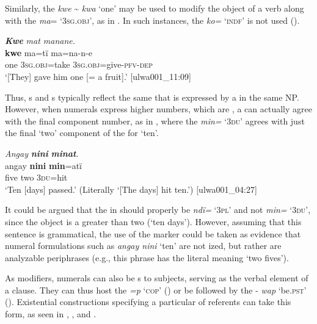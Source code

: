 Similarly, the  \textit{kwe} {\textasciitilde} \textit{kwa} ‘one’ may be used to modify the object of a verb along with the  \textit{ma}= ‘3\textsc{sg.obj}’, as in . In such instances, the   \textit{ko=} ‘\textsc{indf}’ is not used ().

\ea%
    \label{ex:det:229}
          \textbf{\textit{Kwe}} \textit{mat manane.}\\
\gll    \textbf{kwe}  ma=tï    ma=na-n-e\\
    one    3\textsc{sg.obj}=take  3\textsc{sg.obj}=give-\textsc{pfv-dep}\\
\glt `[They] gave him one [= a fruit].’ [ulwa001\_11:09]
\z

Thus, s and s typically reflect the same  that is expressed by a  in the same NP. However, when numerals express higher numbers, which are , a  can actually agree with the final component number, as in , where the   \textit{min=} ‘3\textsc{du}’ agrees with just the final ‘two’ component of the  for ‘ten’.

\ea%
    \label{ex:det:230}
          \textit{Angay} \textbf{\textit{nini}} \textbf{\textit{minat}}.\\
\gll angay  \textbf{nini}  \textbf{min}=atï\\
    five  two  3\textsc{du}=hit\\
\glt `Ten [days] passed.’ (Literally ‘[The days] hit ten.’) [ulwa001\_04:27]
\z

It could be argued that the  in  should properly be \textit{ndï=} ‘3\textsc{pl}’ and not \textit{min=} ‘3\textsc{du}’, since the object is a  greater than two (‘ten days’). However, assuming that this sentence is grammatical, the use of the  marker could be taken as evidence that numeral formulations such as \textit{angay nini} ‘ten’ are not ized, but rather are analyzable periphrases (e.g., this phrase has the literal meaning ‘two fives’).

  As modifiers, numerals can also be s to subjects, serving as the verbal element of a clause. They can thus host the  \textit{=p} ‘\textsc{cop}’ () or be followed by the  -  \textit{wap} ‘be.\textsc{pst’} ().  Existential constructions specifying a particular  of referents can take this form, as seen in , , and .

